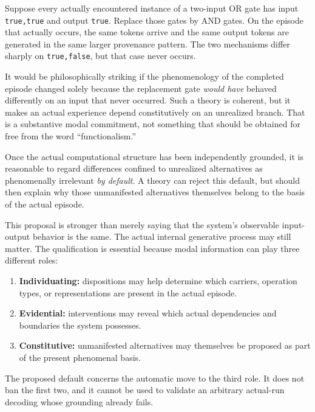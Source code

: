 \documentclass[11pt,a4paper]{article}
\begin{document}
Suppose every actually encountered instance of a two-input OR gate has input \texttt{true,true} and output \texttt{true}. Replace those gates by AND gates. On the episode that actually occurs, the same tokens arrive and the same output tokens are generated in the same larger provenance pattern. The two mechanisms differ sharply on \texttt{true,false}, but that case never occurs.

It would be philosophically striking if the phenomenology of the completed episode changed solely because the replacement gate \emph{would have} behaved differently on an input that never occurred. Such a theory is coherent, but it makes an actual experience depend constitutively on an unrealized branch. That is a substantive modal commitment, not something that should be obtained for free from the word ``functionalism.''

\begin{principlebox}[title={Counterfactual Irrelevance: a plausible default}]
Once the actual computational structure has been independently grounded, it is reasonable to regard differences confined to unrealized alternatives as phenomenally irrelevant \emph{by default}. A theory can reject this default, but should then explain why those unmanifested alternatives themselves belong to the basis of the actual episode.
\end{principlebox}

This proposal is stronger than merely saying that the system's observable input-output behavior is the same. The actual internal generative process may still matter. The qualification is essential because modal information can play three different roles:

\begin{enumerate}
  \item \textbf{Individuating:} dispositions may help determine which carriers, operation types, or representations are present in the actual episode.
  \item \textbf{Evidential:} interventions may reveal which actual dependencies and boundaries the system possesses.
  \item \textbf{Constitutive:} unmanifested alternatives may themselves be proposed as part of the present phenomenal basis.
\end{enumerate}

The proposed default concerns the automatic move to the third role. It does not ban the first two, and it cannot be used to validate an arbitrary actual-run decoding whose grounding already fails.
\end{document}
